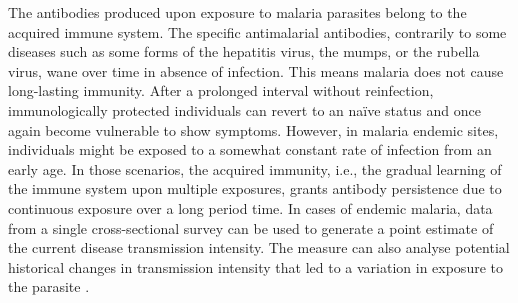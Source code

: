 The antibodies produced upon exposure to malaria parasites belong to the acquired immune system.
The specific antimalarial antibodies, contrarily to some diseases such as some forms of the hepatitis virus, the mumps, or the rubella virus, wane over time in absence of infection.
This means malaria does not cause long-lasting immunity.
After a prolonged interval without reinfection, immunologically protected individuals can revert to an naïve status and once again become vulnerable to show symptoms.
However, in malaria endemic sites, individuals might be exposed to a somewhat constant rate of infection from an early age.
In those scenarios, the acquired immunity, i.e., the gradual learning of the immune system upon multiple exposures, grants antibody persistence due to continuous exposure over a long period time.
In cases of endemic malaria, data from a single cross-sectional survey can be used to generate a point estimate of the current disease transmission intensity.
The measure can also analyse potential historical changes in transmission intensity that led to a variation in exposure to the parasite \cite{hens2012modeling}.
